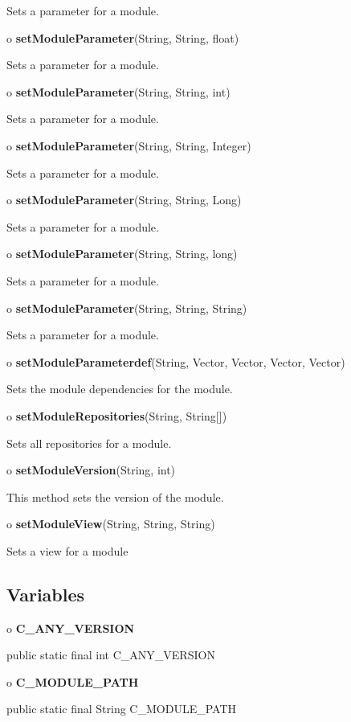 \begin{description}
Sets a parameter for a module.  
\item o {\bf setModuleParameter}(String, String, float)  

Sets a parameter for a module.  
\item o {\bf setModuleParameter}(String, String, int)  

Sets a parameter for a module.  
\item o {\bf setModuleParameter}(String, String, Integer)  

Sets a parameter for a module.  
\item o {\bf setModuleParameter}(String, String, Long)  

Sets a parameter for a module.  
\item o {\bf setModuleParameter}(String, String, long)  

Sets a parameter for a module.  
\item o {\bf setModuleParameter}(String, String, String)  

Sets a parameter for a module.  
\item o {\bf setModuleParameterdef}(String, Vector, Vector, Vector, Vector)  

Sets the module dependencies for the module.  
\item o {\bf setModuleRepositories}(String, String[])  

Sets all repositories for a module.  
\item o {\bf setModuleVersion}(String, int)  

This method sets the version of the module.  
\item o {\bf setModuleView}(String, String, String)  

Sets a view for a module 
\end{description}

\subsection*{  Variables }

o {\bf C\_ANY\_VERSION} 

\begin{PRE}
 public static final int C\_ANY\_VERSION
\end{PRE}

o {\bf C\_MODULE\_PATH} 

\begin{PRE}
 public static final String C\_MODULE\_PATH
\end{PRE}

